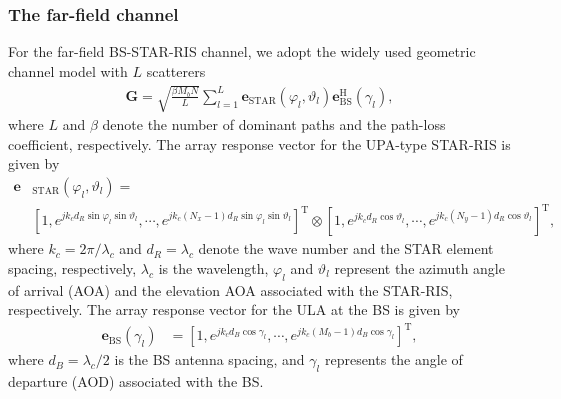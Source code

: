 \documentclass[12pt, draftclsnofoot, onecolumn]{IEEEtran}
\begin{document}
\subsubsection{The far-field channel}
For the far-field BS-STAR-RIS channel, we adopt the widely used geometric channel model with $L$ scatterers
\begin{equation}
\begin{aligned}\label{H}
\mathbf{G}=\sqrt{\frac{\beta M_b N}{L}} \sum\nolimits_{l=1}^{L} \mathbf{e}_\text{STAR}\left(\varphi_{l}, \vartheta_{l}\right)\mathbf{e}^{\mathrm{H}}_\text{BS}\left(\gamma_{l}\right),
\end{aligned}
\end{equation}
where $L$ and $\beta$ denote the number of dominant paths and the path-loss coefficient, respectively. The array response vector for the UPA-type STAR-RIS is given by
\begin{equation}
\begin{aligned}
\mathbf{e}&_\text{STAR}\left(\varphi_l, \vartheta_l\right)=\\
&\left[1,e^{jk_cd_R\sin\varphi_l\sin\vartheta_l}, \cdots, e^{jk_c\left(N_x-1\right)d_R\sin\varphi_l\sin\vartheta_l}\right]^\mathrm{T}\otimes\left[1,e^{jk_cd_R\cos\vartheta_l}, \cdots, e^{jk_c\left(N_y-1\right)d_R\cos\vartheta_l}\right]^\mathrm{T},
\end{aligned}
\end{equation}
where $k_c=2\pi/\lambda_c$ and $d_R=\lambda_c$ denote the wave number and the STAR element spacing, respectively, $\lambda_c$ is the wavelength, $\varphi_l$ and $\vartheta_l$ represent the azimuth angle of arrival (AOA) and the elevation AOA associated with the STAR-RIS, respectively. The array response vector for the ULA at the BS is given by
\begin{equation}
\label{ULA}
\begin{aligned}
\mathbf{e}_\text{BS}\left(\gamma_l\right)&=\left[1,e^{jk_cd_B\cos\gamma_l},\cdots,e^{jk_c\left(M_b-1\right)d_B\cos\gamma_l}\right]^\mathrm{T},
\end{aligned}
\end{equation}
where $d_B=\lambda_c/2$ is the BS antenna spacing, and $\gamma_l$ represents the angle
of departure (AOD) associated with the BS.\vspace{-0.1cm}
\end{document}
